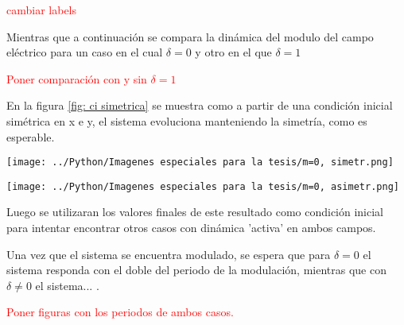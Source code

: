 	\textcolor{red}{cambiar labels}

	Mientras que a continuación se compara la dinámica del modulo del campo eléctrico para un caso en el cual $\delta =0$ y otro en el que $\delta = 1$


	\textcolor{red}{Poner comparación con y sin $\delta =1 $ }


	En la figura \ref{fig: ci simetrica} se muestra como a partir de una condición inicial simétrica en x e y, el sistema evoluciona manteniendo la simetría, como es esperable.
	\begin{center}
		\texttt{[image: ../Python/Imagenes especiales para la tesis/m=0, simetr.png]}
		\label{fig: ci simetrica}
	\end{center}
	
%	
	
	\begin{center}
		\texttt{[image: ../Python/Imagenes especiales para la tesis/m=0, asimetr.png]}
	\end{center}
		
		
	Luego se utilizaran los valores finales de este resultado como condición inicial para intentar encontrar otros casos con dinámica 'activa' en ambos campos.	
	
	Una vez que el sistema se encuentra modulado, se espera que para $\delta=0$ el sistema responda con el doble del periodo de la modulación, mientras que con $\delta\neq 0$ el sistema...  .
	
		\textcolor{red}{Poner figuras con los periodos de ambos casos. }
	
	


